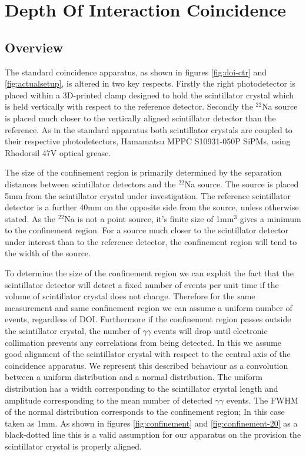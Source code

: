 \section{Depth Of Interaction Coincidence}
\subsection{Overview}
The standard coincidence apparatus, as shown in figures \ref{fig:doi-ctr} and \ref{fig:actualsetup}, is altered in two key respects. Firstly the right photodetector is placed within a 3D-printed clamp designed to hold the scintillator crystal which is held vertically with respect to the reference detector. Secondly the $^{22}$Na source is placed much closer to the vertically aligned scintillator detector than the reference. As in the standard apparatus both scintillator crystals are coupled to their respective photodetectors, Hamamatsu MPPC S10931-050P SiPMs, using Rhodorsil 47V optical grease. 

The size of the confinement region is primarily determined by the separation distances between scintillator detectors and the $^{22}$Na source. The source is placed 5mm from the scintillator crystal under investigation. The reference scintillator detector is a further 40mm on the opposite side from the source, unless otherwise stated. As the $^{22}$Na is not a point source, it's finite size of 1mm$^3$ gives a minimum to the confinement region. For a source much closer to the scintillator detector under interest than to the reference detector, the confinement region will tend to the width of the source. 

To determine the size of the confinement region we can exploit the fact that the scintillator detector will detect a fixed number of events per unit time if the volume of scintillator crystal does not change. Therefore for the same measurement and same confinement region we can assume a uniform number of events, regardless of DOI. Furthermore if the confinement region passes outside the scintillator crystal, the number of $\gamma\gamma$ events will drop until electronic collimation prevents any correlations from being detected. In this we assume good alignment of the scintillator crystal with respect to the central axis of the coincidence apparatus. We represent this described behaviour as a convolution between a uniform distribution and a normal distribution. The uniform distribution has a width corresponding to the scintillator crystal length and amplitude corresponding to the mean number of detected $\gamma\gamma$ events. The FWHM of the normal distribution corresponds to the confinement region; In this case taken as 1mm. As shown in figures \ref{fig:confinement} and \ref{fig:confinement-20} as a black-dotted line this is a valid assumption for our apparatus on the provision the scintillator crystal is properly aligned.

